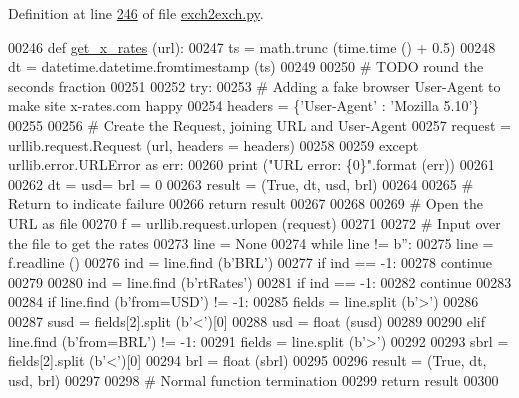 Definition at line \hyperlink{exch2exch_8py_source_l00246}{246} of file \hyperlink{exch2exch_8py_source}{exch2exch.\+py}.


\begin{DoxyCode}
00246 \textcolor{keyword}{def }\hyperlink{namespaceexch2exch_a928a1249a810cfd0ec5fca3ec8f764fb}{get\_x\_rates} (url):
00247     ts = math.trunc (time.time () + 0.5)
00248     dt = datetime.datetime.fromtimestamp (ts)
00249     
00250     \textcolor{comment}{# TODO round the seconds fraction}
00251     
00252     \textcolor{keywordflow}{try}:
00253         \textcolor{comment}{# Adding a fake browser User-Agent to make site x-rates.com happy}
00254         headers = \{\textcolor{stringliteral}{'User-Agent'} : \textcolor{stringliteral}{'Mozilla 5.10'}\}
00255             
00256         \textcolor{comment}{# Create the Request, joining URL and User-Agent}
00257         request = urllib.request.Request (url, headers = headers)
00258         
00259     \textcolor{keywordflow}{except} urllib.error.URLError \textcolor{keyword}{as} err:
00260         \textcolor{keywordflow}{print} (\textcolor{stringliteral}{"URL error: \{0\}"}.format (err))
00261         
00262         dt = usd= brl = 0
00263         result = (\textcolor{keyword}{True}, dt, usd, brl)
00264         
00265         \textcolor{comment}{# Return to indicate failure}
00266         \textcolor{keywordflow}{return} result
00267 
00268         
00269     \textcolor{comment}{# Open the URL as file}
00270     f = urllib.request.urlopen (request)
00271     
00272     \textcolor{comment}{# Input over the file to get the rates}
00273     line = \textcolor{keywordtype}{None}
00274     \textcolor{keywordflow}{while} line != b\textcolor{stringliteral}{''}:
00275         line = f.readline ()
00276         ind = line.find (b\textcolor{stringliteral}{'BRL'})
00277         \textcolor{keywordflow}{if} ind == -1:
00278             \textcolor{keywordflow}{continue} 
00279         
00280         ind = line.find (b\textcolor{stringliteral}{'rtRates'})
00281         \textcolor{keywordflow}{if} ind == -1:
00282             \textcolor{keywordflow}{continue} 
00283                 
00284         \textcolor{keywordflow}{if} line.find (b\textcolor{stringliteral}{'from=USD'}) != -1:
00285             fields = line.split (b\textcolor{stringliteral}{'>'})
00286             
00287             susd = fields[2].split (b\textcolor{stringliteral}{'<'})[0]
00288             usd = float (susd)
00289         
00290         \textcolor{keywordflow}{elif} line.find (b\textcolor{stringliteral}{'from=BRL'}) != -1:
00291             fields = line.split (b\textcolor{stringliteral}{'>'})
00292             
00293             sbrl = fields[2].split (b\textcolor{stringliteral}{'<'})[0]
00294             brl = float (sbrl)
00295             
00296     result = (\textcolor{keyword}{True}, dt, usd, brl)
00297     
00298     \textcolor{comment}{# Normal function termination}
00299     \textcolor{keywordflow}{return} result
00300     
\end{DoxyCode}
\mbox{\label{namespaceexch2exch_a4a7d6bc2c47add0970ca3e0c28a5cb63}} 

